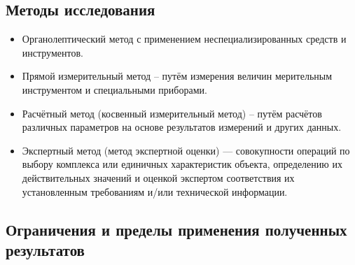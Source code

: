 \subsection{Методы исследования}
\begin{itemize}
\item  Органолептический метод с применением неспециализированных средств и инструментов.
\item 	Прямой измерительный метод – путём измерения величин  %
мерительным инструментом и специальными приборами.
\item Расчётный метод (косвенный измерительный метод) – путём расчётов различных параметров на основе результатов измерений и других данных.
\item Экспертный метод (метод экспертной оценки) — совокупности операций по выбору комплекса или единичных характеристик объекта, определению их действительных значений и оценкой экспертом соответствия их установленным требованиям и/или технической информации.
\end{itemize}
%
%
\subsection{Ограничения и пределы применения полученных результатов}

